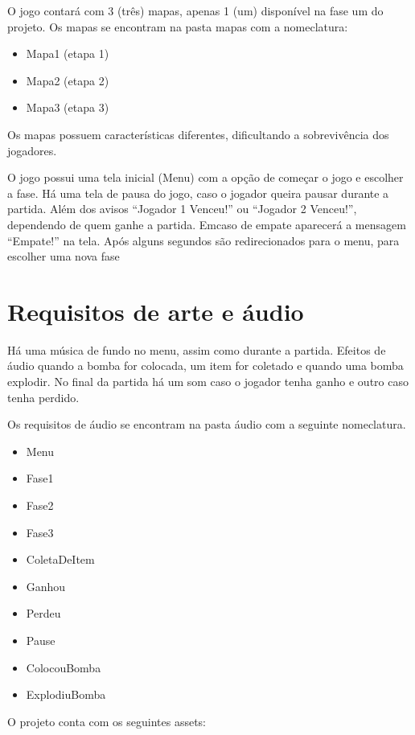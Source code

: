 \documentclass[12pt]{article}
\begin{document}
	O jogo contará com 3 (três) mapas, apenas 1 (um)
	disponível na fase um do projeto.  Os mapas se
	encontram na pasta mapas com a nomeclatura:

	\begin{itemize}
		\item Mapa1 (etapa 1)
		\item Mapa2 (etapa 2)
		\item Mapa3 (etapa 3)
	\end{itemize}

	Os mapas possuem características diferentes,
	dificultando a sobrevivência dos jogadores.

	O jogo possui uma tela inicial (Menu) com a opção de
	começar o jogo e escolher a fase. Há uma tela de pausa
	do jogo, caso o jogador queira pausar durante a partida.
	Além dos avisos “Jogador 1 Venceu!” ou “Jogador 2
	Venceu!”, dependendo de quem ganhe a partida. Emcaso de
	empate aparecerá a mensagem “Empate!” na tela. Após
	alguns segundos são redirecionados para o menu, para
	escolher uma nova fase

\section{Requisitos de arte e áudio}

	Há uma música de fundo no menu, assim como durante a
	partida. Efeitos de áudio quando a bomba for colocada,
	um item for coletado e quando uma bomba explodir. No
	final da partida há um som caso o jogador tenha ganho e
	outro caso tenha perdido.

	Os requisitos de áudio se encontram na pasta áudio
	com a seguinte nomeclatura.

	\begin{itemize}
		\item Menu
		\item Fase1
		\item Fase2
		\item Fase3
		\item ColetaDeItem
		\item Ganhou
		\item Perdeu
		\item Pause
		\item ColocouBomba
		\item ExplodiuBomba
	\end{itemize}

	O projeto conta com os seguintes assets:
\end{document}
